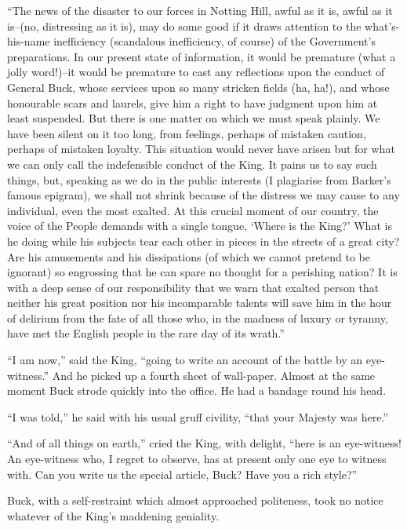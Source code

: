 \documentclass{book}
\begin{document}
“The news of the disaster to our forces in Notting Hill, awful as it is, awful as it is–(no, distressing as it is), may do some good if it draws attention to the what’s-his-name inefficiency (scandalous inefficiency, of course) of the Government’s preparations. In our present state of information, it would be premature (what a jolly word!)–it would be premature to cast any reflections upon the conduct of General Buck, whose services upon so many stricken fields (ha, ha!), and whose honourable scars and laurels, give him a right to have judgment upon him at least suspended. But there is one matter on which we must speak plainly. We have been silent on it too long, from feelings, perhaps of mistaken caution, perhaps of mistaken loyalty. This situation would never have arisen but for what we can only call the indefensible conduct of the King. It pains us to say such things, but, speaking as we do in the public interests (I plagiarise from Barker’s famous epigram), we shall not shrink because of the distress we may cause to any individual, even the most exalted. At this crucial moment of our country, the voice of the People demands with a single tongue, ‘Where is the King?’ What is he doing while his subjects tear each other in pieces in the streets of a great city? Are his amusements and his dissipations (of which we cannot pretend to be ignorant) so engrossing that he can spare no thought for a perishing nation? It is with a deep sense of our responsibility that we warn that exalted person that neither his great position nor his incomparable talents will save him in the hour of delirium from the fate of all those who, in the madness of luxury or tyranny, have met the English people in the rare day of its wrath.”

“I am now,” said the King, “going to write an account of the battle by an eye-witness.” And he picked up a fourth sheet of wall-paper. Almost at the same moment Buck strode quickly into the office. He had a bandage round his head.

“I was told,” he said with his usual gruff civility, “that your Majesty was here.”

“And of all things on earth,” cried the King, with delight, “here is an eye-witness! An eye-witness who, I regret to observe, has at present only one eye to witness with. Can you write us the special article, Buck? Have you a rich style?”

Buck, with a self-restraint which almost approached politeness, took no notice whatever of the King’s maddening geniality.
\end{document}
